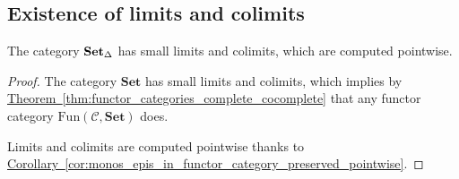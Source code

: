 \documentclass[main.tex]{subfiles}
\begin{document}
\subsection{Existence of limits and colimits}
\label{ssc:existence_of_limits_and_colimits}

\begin{proposition}
  \label{prop:sset_has_limits_colimits}
  The category $\operatorname{\mathbf{Set}_{\Delta}}$ has small limits and colimits, which are computed pointwise.
\end{proposition}
\begin{proof}
  The category $\mathbf{Set}$ has small limits and colimits, which implies by \hyperref[thm:functor_categories_complete_cocomplete]{Theorem~\ref*{thm:functor_categories_complete_cocomplete}} that any functor category $\mathrm{Fun}(\mathcal{C}, \mathbf{Set})$ does.

  Limits and colimits are computed pointwise thanks to \hyperref[cor:monos_epis_in_functor_category_preserved_pointwise]{Corollary~\ref*{cor:monos_epis_in_functor_category_preserved_pointwise}}.
\end{proof}
\end{document}
